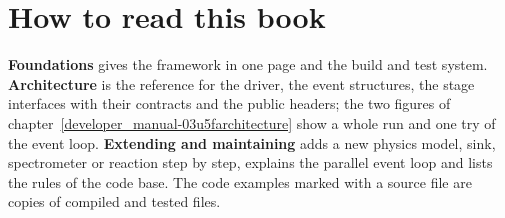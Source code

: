 \section*{How to read this book}
\textbf{Foundations} gives the framework in one page and the build and test system. \textbf{Architecture} is the
reference for the driver, the event structures, the stage interfaces with their contracts and the public headers; the
two figures of chapter~\ref{developer_manual-03u5farchitecture} show a whole run and one try of the event loop.
\textbf{Extending and maintaining} adds a new physics model, sink, spectrometer or reaction step by step, explains the
parallel event loop and lists the rules of the code base. The code examples marked with a source file are copies of
compiled and tested files.
